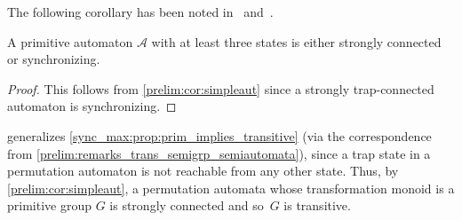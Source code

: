 The following corollary has been noted in~\cite[Sect.~5.1]{RystsovSzykula2023}
and~\cite[Prop.~3.1]{Volkov24}.

\begin{corollary}
	A primitive automaton $\mathcal A$ with at least three states is either strongly connected or synchronizing.	
\end{corollary}
\begin{proof}
	This follows from \cref{prelim:cor:simpleaut} since a strongly trap-connected automaton
	is synchronizing.
\end{proof}

\begin{remark}
	 generalizes 
	\cref{sync_max:prop:prim_implies_transitive} (via the correspondence from \cref{prelim:remarks_trans_semigrp_semiautomata}),
	since a trap state in a permutation automaton
	is not reachable from any other state.
	Thus, by \cref{prelim:cor:simpleaut}, a permutation automata
	whose transformation monoid is a primitive group $G$
	is strongly connected and so~$G$ is transitive.	
\end{remark}

